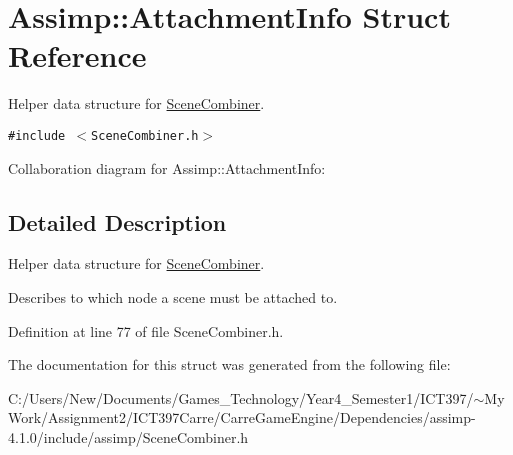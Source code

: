\hypertarget{struct_assimp_1_1_attachment_info}{
\section{Assimp::AttachmentInfo Struct Reference}
\label{struct_assimp_1_1_attachment_info}
}
Helper data structure for \hyperlink{class_assimp_1_1_scene_combiner}{SceneCombiner}.  


{\tt \#include $<$SceneCombiner.h$>$}

Collaboration diagram for Assimp::AttachmentInfo:

\subsection{Detailed Description}
Helper data structure for \hyperlink{class_assimp_1_1_scene_combiner}{SceneCombiner}. 

Describes to which node a scene must be attached to. 

Definition at line 77 of file SceneCombiner.h.

The documentation for this struct was generated from the following file:\begin{CompactItemize}
\item 
C:/Users/New/Documents/Games\_\-Technology/Year4\_\-Semester1/ICT397/$\sim$My Work/Assignment2/ICT397Carre/CarreGameEngine/Dependencies/assimp-4.1.0/include/assimp/SceneCombiner.h\end{CompactItemize}
